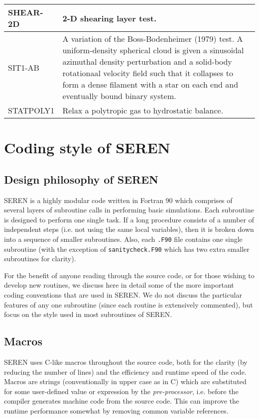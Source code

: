 \documentclass[a4paper]{article}
\newcommand{\var}[1]{\texttt{#1}}
\begin{document}
\begin{center}
\begin{supertabular}{|p{3cm}|p{10cm}|}
SHEAR-2D & 2-D shearing layer test. \\ \hline

SIT1-AB  & A variation of the Boss-Bodenheimer (1979) test.  
           A uniform-density spherical cloud is given a sinusoidal azimuthal 
           density perturbation and a solid-body rotationaal velocity field 
           such that it collapses to form a dense filament with a star on 
           each end and eventually bound binary system. \\ \hline

STATPOLY1 & Relax a polytropic gas to hydrostatic balance. \\ \hline

\end{supertabular}
\end{center}

\newpage


\section{Coding style of SEREN}


\subsection{Design philosophy of SEREN}
SEREN is a highly modular code written in Fortran 90 which comprises of several layers of subroutine calls in performing basic simulations.  Each subroutine is designed to perform one single task.  If a long procedure consists of a number of independent steps (i.e. not using the same local variables), then it is broken down into a sequence of smaller subroutines.  Also, each \var{.F90} file contains one single subroutine (with the exception of \var{sanitycheck.F90} which has two extra smaller subroutines for clarity).

For the benefit of anyone reading through the source code, or for those wishing to develop new routines, we discuss here in detail some of the more important coding conventions that are used in SEREN.  We do not discuss the particular features of any one subroutine (since each routine is extensively commented), but focus on the style used in most subroutines of SEREN.  


\subsection{Macros} \label{SS:MACROS}
SEREN uses C-like macros throughout the source code, both for the clarity (by reducing the number of lines) and the efficiency and runtime speed of the code.  Macros are strings (conventionally in upper case as in C) which are substituted for some user-defined value or expression by the {\it pre-processor}, i.e. before the compiler generates machine code from the source code.  This can improve the runtime performance somewhat by removing common variable references.  
\end{document}
